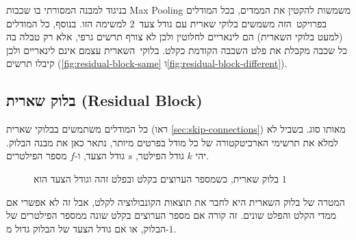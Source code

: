 \documentclass[hebrew, a4paper]{article}
\theoremstyle{plain}
\theoremstyle{definition}
\numberwithin{equation}{section}
\begin{document}
בניגוד למבנה המסורתי בו שכבות Max Pooling משמשות להקטין את הממדים, בכל
המודלים בפרויקט~הזה משמשים בלוקי שארית עם גודל צעד~$2$ למשימה הזו.
בנוסף, כל המודלים (למעט בלוקי השארית) הם לינאריים לחלוטין ולכן לא צורף
תרשים גרפי, אלא רק טבלה בה כל שכבה מקבלת את פלט השכבה הקודמת כקלט.
בלוקי~השארית עצמם אינם לינאריים ולכן קיבלו תרשים
(\autoref{fig:residual-block-same}
ו\autoref{fig:residual-block-different}).

\subsection{בלוק שארית (Residual Block)}
\label{sec:architecture-residual-block}

כל המודלים משתמשים בבלוקי שארית (ראו \autoref{sec:skip-connections})
מאותו סוג. בשביל לא למלא את תרשימי הארכיטקטורה של כל מודל בפרטים
מיותר, נתאר כאן את מבנה הבלוק. יהי $k$ גודל הפילטר, $s$ גודל הצעד,
ו-$f$ מספר הפילטרים.


\begin{figure}[htbp]
  \centering
  \begin{otherlanguage}{english}
  \end{otherlanguage}
  \caption{בלוק שארית, כשמספר הערוצים בקלט ובפלט זהה וגודל הצעד הוא $1$}
  \label{fig:residual-block-same}
\end{figure}

המטרה של בלוק השארית היא לחבר את תוצאות הקונבולוציה לקלט, אבל זה לא
אפשרי אם ממדי הקלט והפלט שונים. זה קורה אם מספר הערוצים בקלט שונה
ממספר הפילטרים של הבלוק, או אם גודל הצעד של הבלוק גדול מ-$1$.
\end{document}
